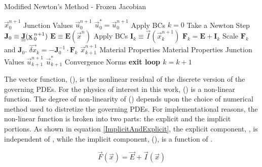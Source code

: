 \begin{algorithm}
\setlength{\baselineskip}{0.625\baselineskip}
\label{ModifiedNewtonsAlgorithm}
\caption{Modified Newton's Method - Frozen Jacobian}
\begin{algorithmic}[1]
\Define $\vec{x}^{n+1}_0$ 
\Calculate Junction Values
\Calculate $\vec{u}^{n+1}_0$
\Set $\vec{u}^{*}_0 = \vec{u}^{n+1}_0$
\State Apply BCs
\Set $k = 0$
\Loop \quad Take a Newton Step
        \Calculate $\mathbf{J}_{0} \equiv \Mat{J}(\Vec{x}^{n+1}_0)$
        \Calculate $\mathbf{E} \equiv \mathbf{E}(\Vec{x}^{n})$
    \Else
        \State Apply BCs
    \EndIf
    \Calculate $\mathbf{I}_k \equiv \Vec{I}(\Vec{x}^{n+1}_k)$
    \Calculate $\mathbf{F}_{k} = \mathbf{E} + \mathbf{I}_k$
    \BlackBox Scale $\mathbf{F}_k$ and $\mathbf{J}_0$.
    \BlackBox $\Vec{\delta x}_k = -\mathbf{J}^{-1}_0\cdot \mathbf{F}_k$ 
    \BlackBox $\Vec{x}^{n+1}_{k+1}$ 
    \Update Material Properties 
    \Test Material Properties
    \Update Junction Values 
    \Update $\vec{u}^{n+1}_{k+1}$ 
    \Update $\Vec{u}^{*}_{k+1}$ 
    \Calculate Convergence Norms
        \State \bf{exit loop}
    \EndIf
\EndLoop \quad $k = k+1$
\end{algorithmic}
\end{algorithm}



The vector function, (), is the nonlinear residual of the discrete version of the governing PDEs.
For the physics of interest in this work, () is a non-linear function.
The degree of non-linearity of () depends upon the choice of numerical method used to distretize the governing PDEs.
For implementational reasons, the non-linear function is broken into two parts: the explicit and the implicit portions.
As shown in equation \eqref{ImplicitAndExplicit}, the explicit component, , is independent of , while the implicit component, (), is a function of .

\begin{equation}
\label{ImplicitAndExplicit}
\Vec{F}(\Vec{x}) = \Vec{E} + \Vec{I}(\Vec{x})
\end{equation}

